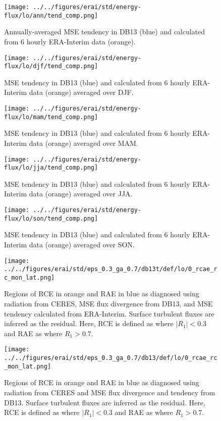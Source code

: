 \documentclass[11pt]{article}
\begin{document}
\begin{figure}[htbp]
\centering
\texttt{[image: ../../figures/erai/std/energy-flux/lo/ann/tend\_comp.png]}
\caption{\label{fig:org41a190c}Annually-averaged MSE tendency in DB13 (blue) and calculated from 6 hourly ERA-Interim data (orange).}
\end{figure}

\begin{figure}[htbp]
\centering
\texttt{[image: ../../figures/erai/std/energy-flux/lo/djf/tend\_comp.png]}
\caption{\label{fig:org904dc58}MSE tendency in DB13 (blue) and calculated from 6 hourly ERA-Interim data (orange) averaged over DJF.}
\end{figure}

\begin{figure}[htbp]
\centering
\texttt{[image: ../../figures/erai/std/energy-flux/lo/mam/tend\_comp.png]}
\caption{\label{fig:org8cb1bab}MSE tendency in DB13 (blue) and calculated from 6 hourly ERA-Interim data (orange) averaged over MAM.}
\end{figure}

\begin{figure}[htbp]
\centering
\texttt{[image: ../../figures/erai/std/energy-flux/lo/jja/tend\_comp.png]}
\caption{\label{fig:orgf9db9e1}MSE tendency in DB13 (blue) and calculated from 6 hourly ERA-Interim data (orange) averaged over JJA.}
\end{figure}

\begin{figure}[htbp]
\centering
\texttt{[image: ../../figures/erai/std/energy-flux/lo/son/tend\_comp.png]}
\caption{\label{fig:org0e7e926}MSE tendency in DB13 (blue) and calculated from 6 hourly ERA-Interim data (orange) averaged over SON.}
\end{figure}

\begin{figure}[htbp]
\centering
\texttt{[image: ../../figures/erai/std/eps\_0.3\_ga\_0.7/db13t/def/lo/0\_rcae\_rc\_mon\_lat.png]}
\caption{\label{fig:org18c58bc}Regions of RCE in orange and RAE in blue as diagnosed using radiation from CERES, MSE flux divergence from DB13, and MSE tendency calculated from ERA-Interim. Surface turbulent fluxes are inferred as the residual. Here, RCE is defined as where \(|R_1| < 0.3\) and RAE as where \(R_1 > 0.7\).}
\end{figure}

\begin{figure}[htbp]
\centering
\texttt{[image: ../../figures/erai/std/eps\_0.3\_ga\_0.7/db13/def/lo/0\_rcae\_rc\_mon\_lat.png]}
\caption{\label{fig:orga993cae}Regions of RCE in orange and RAE in blue as diagnosed using radiation from CERES and MSE flux divergence and tendency from DB13. Surface turbulent fluxes are inferred as the residual. Here, RCE is defined as where \(|R_1| < 0.3\) and RAE as where \(R_1 > 0.7\).}
\end{figure}
\end{document}
